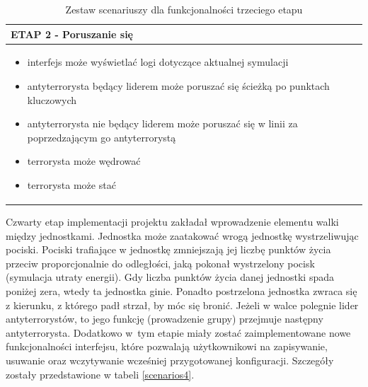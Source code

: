 \begin{table}
\begin{center}
\begin{tabular}{|p{}|}
\hline
ETAP 2 - Poruszanie się\\\hline
	\begin{itemize}
		\setlength\itemsep{0pt}
		\item interfejs może wyświetlać logi dotyczące aktualnej symulacji
		\item antyterrorysta będący liderem może poruszać się ścieżką po punktach kluczowych
		\item antyterrorysta nie będący liderem może poruszać się w linii za poprzedzającym go antyterrorystą
		\item terrorysta może wędrować
		\item terrorysta może stać
	\end{itemize}
\\\hline
\end{tabular}
\caption {Zestaw scenariuszy dla funkcjonalności trzeciego etapu\label{scenarios3}}
\end{center}
\end{table} 

Czwarty etap implementacji projektu zakładał wprowadzenie elementu walki między jednostkami. Jednostka może zaatakować wrogą jednostkę wystrzeliwując pociski. Pociski trafiające w jednostkę zmniejszają jej liczbę punktów życia przeciw proporcjonalnie do odległości, jaką pokonał wystrzelony pocisk (symulacja utraty energii). Gdy liczba punktów życia danej jednostki spada poniżej zera, wtedy ta jednostka ginie. Ponadto postrzelona jednostka zwraca się z kierunku, z którego padł strzał, by móc się bronić. Jeżeli w walce polegnie lider antyterrorystów, to jego funkcję (prowadzenie grupy) przejmuje następny antyterrorysta. Dodatkowo w~tym etapie miały zostać zaimplementowane nowe funkcjonalności interfejsu, które pozwalają użytkownikowi na zapisywanie, usuwanie oraz wczytywanie wcześniej przygotowanej konfiguracji. Szczegóły zostały przedstawione w tabeli \ref{scenarios4}.

